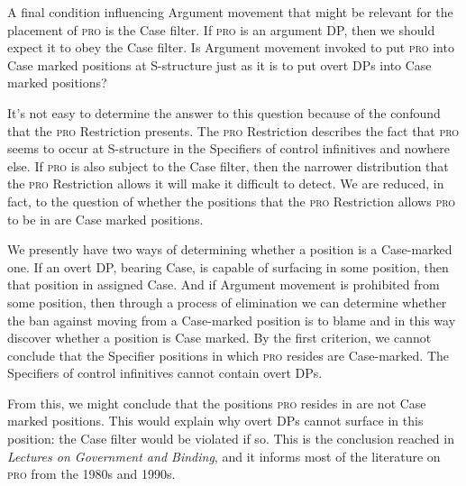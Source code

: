 A final condition influencing Argument movement that might be relevant for the placement of \textsc{pro} is the Case filter. If \textsc{pro} is an argument DP, then we should expect it to obey the Case filter. Is Argument movement invoked to put \textsc{pro} into Case marked positions at S-structure just as it is to put overt DPs into Case marked positions?

It's not easy to determine the answer to this question because of the confound that the \textsc{pro} Restriction presents. The \textsc{pro} Restriction describes the fact that \textsc{pro} seems to occur at S-structure in the Specifiers of control infinitives and nowhere else. If \textsc{pro} is also subject to the Case filter, then the narrower distribution that the \textsc{pro} Restriction allows it will make it difficult to detect. We are reduced, in fact, to the question of whether the positions that the \textsc{pro} Restriction allows \textsc{pro} to be in are Case marked positions.

We presently have two ways of determining whether a position is a Case-marked one. If an overt DP, bearing Case, is capable of surfacing in some position, then that position in assigned Case. And if Argument movement is prohibited from some position, then through a process of elimination we can determine whether the ban against moving from a Case-marked position is to blame and in this way discover whether a position is Case marked. By the first criterion, we cannot conclude that the Specifier positions in which \textsc{pro} resides are Case-marked. The Specifiers of control infinitives cannot contain overt DPs.
\begin{exe}
\ex \label{ex3:noovertcontrol} 
\begin{xlist}
\end{xlist}
\end{exe}
From this, we might conclude that the positions \textsc{pro} resides in are not Case marked positions. This would explain why overt DPs cannot surface in this position: the Case filter would be violated if so. This is the conclusion reached in \emph{Lectures on Government and Binding}, and it informs most of the literature on \textsc{pro} from the 1980s and 1990s.

